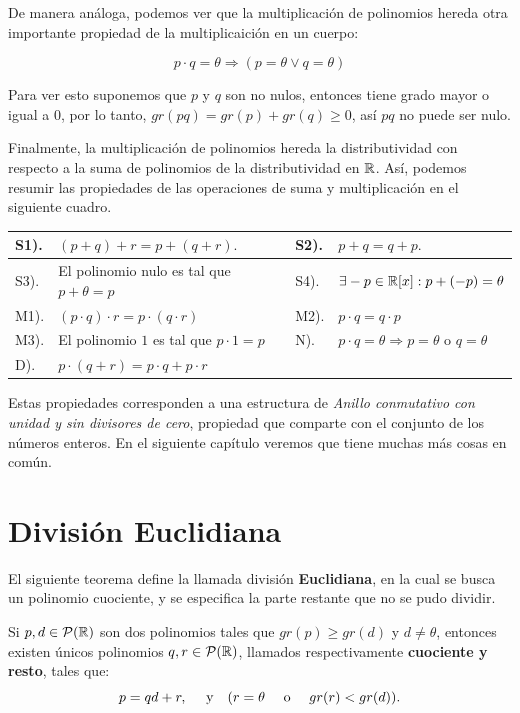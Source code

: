 De manera análoga, podemos ver que la multiplicación de polinomios hereda otra importante propiedad de la multiplicaición en un cuerpo:

$$p\cdot q=\theta \Longrightarrow (p=\theta \vee q=\theta)$$

Para ver esto suponemos que $p$ y $q$ son no nulos, entonces tiene grado mayor o igual a 0, por lo tanto, $gr(pq)=gr(p)+gr(q)\ge 0$, así $pq$ no puede ser nulo.

Finalmente, la multiplicación de polinomios hereda la distributividad con respecto a la suma de polinomios de la distributividad en $\mathbb{R}$. 
Así, podemos resumir las propiedades de las operaciones de suma y multiplicación en el siguiente cuadro.

\begin{center}
\begin{tabular}{| l p{7.5cm} | l p{5.5cm} |}
\hline
S1).&$(p+q)+r=p+(q+r).$ & S2).& $p+q=q+p.$    \\
\hline
 S3). & El polinomio nulo es tal que $p+\theta=p$& S4).& $\exists  -p\in  \mathbb{R}[x]:p+(-p)=\theta $\\
\hline
M1).& $(p\cdot q)\cdot r=p\cdot(q\cdot r)$&M2).& $p\cdot q =q \cdot p$\\
\hline
M3). &El polinomio $1$ es tal que $p\cdot 1=p$ &N). & $p\cdot q=\theta \Longrightarrow p=\theta$ o $q=\theta$\\
\hline
D).& $p\cdot (q+r)=p\cdot q+p
\cdot r$ &{}&{}\\
\hline
\end{tabular}
\end{center}

Estas propiedades corresponden a una estructura de \emph{Anillo conmutativo con unidad y sin divisores de cero}, propiedad que comparte  con el conjunto de los n\'umeros enteros. 
En el siguiente capítulo veremos que tiene muchas más cosas en común.

\section{División Euclidiana}

El siguiente teorema define la llamada división {\bf Euclidiana}, en la cual se busca un polinomio cuociente, y se especifica la parte restante que no se pudo dividir.

\medskip

\begin{thm}
Si $p, d \in \mathcal{P}(\mathbb{R})$ son dos polinomios tales que $gr(p)\ge gr(d)$  y $d\ne \theta$, entonces existen  \'unicos polinomios $q, r \in \mathcal{P}(\mathbb{R})$, llamados  respectivamente {\bf cuociente y resto},  tales que:
$$p=q  d +r,\quad \hbox{ y}  \quad (r=\theta \quad  \hbox{ o }  \quad  gr(r) <gr(d)).$$
\end {thm}

